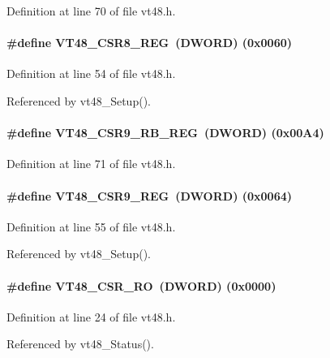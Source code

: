 Definition at line 70 of file vt48.h.
\paragraph[{VT48\_\-CSR8\_\-REG}]{\setlength{\rightskip}{0pt plus 5cm}\#define VT48\_\-CSR8\_\-REG~({\bf DWORD}) (0x0060)}\hfill\label{vt48_8h_ab862b9afa823f5d7d101d0e86f4abe1b}


Definition at line 54 of file vt48.h.

Referenced by vt48\_\-Setup().
\paragraph[{VT48\_\-CSR9\_\-RB\_\-REG}]{\setlength{\rightskip}{0pt plus 5cm}\#define VT48\_\-CSR9\_\-RB\_\-REG~({\bf DWORD}) (0x00A4)}\hfill\label{vt48_8h_a6a6118c74a6ea0a46050b81bdfb81988}


Definition at line 71 of file vt48.h.
\paragraph[{VT48\_\-CSR9\_\-REG}]{\setlength{\rightskip}{0pt plus 5cm}\#define VT48\_\-CSR9\_\-REG~({\bf DWORD}) (0x0064)}\hfill\label{vt48_8h_a0de57c91353915a4c31376e4878fb1f5}


Definition at line 55 of file vt48.h.

Referenced by vt48\_\-Setup().
\paragraph[{VT48\_\-CSR\_\-RO}]{\setlength{\rightskip}{0pt plus 5cm}\#define VT48\_\-CSR\_\-RO~({\bf DWORD}) (0x0000)}\hfill\label{vt48_8h_aa16b2262d75885d2f7e2314b2367c0c7}


Definition at line 24 of file vt48.h.

Referenced by vt48\_\-Status().
